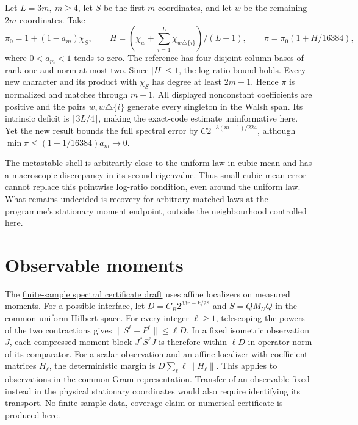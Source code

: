 \documentclass[11pt]{article}
\begin{document}
Let \(L=3m,\ m\ge4\), let \(S\) be the first \(m\) coordinates, and let \(w\) be the remaining \(2m\) coordinates. Take
\[
 \pi_0=1+(1-a_m)\chi_S,\qquad
 H=(\chi_w+\textstyle\sum_{i=1}^L\chi_{w\triangle\{i\}})/(L+1),
 \qquad \pi=\pi_0(1+H/16384),
\]
where \(0<a_m<1\) tends to zero. The reference has four disjoint column bases of rank one and norm at most two. Since \(|H|\le1\), the log ratio bound holds. Every new character and its product with \(\chi_S\) has degree at least \(2m-1\). Hence \(\pi\) is normalized and matches through \(m-1\). All displayed nonconstant coefficients are positive and the pairs \(w,w\triangle\{i\}\) generate every singleton in the Walsh span. Its intrinsic deficit is \(\lceil3L/4\rceil\), making the exact-code estimate uninformative here. Yet the new result bounds the full spectral error by \(C 2^{-3(m-1)/224}\), although \(\min\pi\le(1+1/16384)a_m\to0\).

The \href{https://airr.science/papers/ARR-2026-2B2W1WQ7DF9N5VW7/versions/v1/}{metastable shell} is arbitrarily close to the uniform law in cubic mean and has a macroscopic discrepancy in its second eigenvalue. Thus small cubic-mean error cannot replace this pointwise log-ratio condition, even around the uniform law. What remains undecided is recovery for arbitrary matched laws at the programme's stationary moment endpoint, outside the neighbourhood controlled here.

\section{Observable moments}

The \href{https://github.com/lluiseriksson/finite-sample-spectral-certificates/blob/7ccc9e925847313a3b11132705b4805e3cf4ff8a/THEOREM_DRAFT.md}{finite-sample spectral certificate draft} uses affine localizers on measured moments. For a possible interface, let \(D=C_B2^{33r-k/28}\) and \(S=QM_UQ\) in the common uniform Hilbert space. For every integer \(\ell\ge1\), telescoping the powers of the two contractions gives \(\|S^\ell-P^\ell\|\le\ell D\). In a fixed isometric observation \(J\), each compressed moment block \(J^*S^\ell J\) is therefore within \(\ell D\) in operator norm of its comparator. For a scalar observation and an affine localizer with coefficient matrices \(H_\ell\), the deterministic margin is \(D\sum_\ell \ell\|H_\ell\|\). This applies to observations in the common Gram representation. Transfer of an observable fixed instead in the physical stationary coordinates would also require identifying its transport. No finite-sample data, coverage claim or numerical certificate is produced here.
\end{document}
